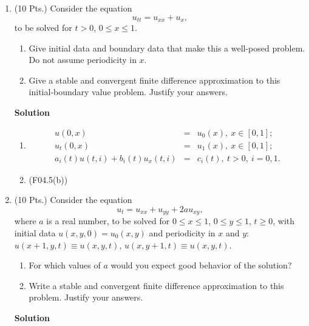 \documentclass{article}
\begin{document}
\begin{enumerate}
\begin{enumerate}
\end{enumerate}



\item (10 Pts.) Consider the equation
\[u_{tt} = u_{xx} + u_x,\]
to be solved for \(t > 0\), \(0 \leq x \leq 1\).

\begin{enumerate}
\item Give initial data and boundary data that make this a well-posed problem.  Do not assume periodicity in \(x\).

\item Give a stable and convergent finite difference approximation to this initial-boundary value problem.  Justify your answers.

\end{enumerate}

{\bf Solution}

\begin{enumerate}
\item
\begin{eqnarray*}
u(0,x) & = & u_0(x), \ x \in [0,1]; \\
u_t(0,x) & = & u_1(x), \ x \in [0,1]; \\
a_i(t)u(t,i) + b_i(t)u_x(t,i) & = & c_i(t), \ t > 0, \ i = 0,1.
\end{eqnarray*}

\item (F04.5(b))

\end{enumerate}



\item (10 Pts.) Consider the equation
\[u_t = u_{xx} + u_{yy} + 2a u_{xy},\]
where \(a\) is a real number, to be solved for \(0 \leq x \leq 1\), \(0 \leq y \leq 1\), \(t \geq 0\), with initial data \(u(x,y,0) = u_0(x,y)\) and periodicity in \(x\) and \(y\):  \(u(x + 1, y, t) \equiv u(x,y,t)\), \(u(x, y + 1, t) \equiv u(x,y,t)\).

\begin{enumerate}
\item For which values of \(a\) would you expect good behavior of the solution?

\item Write a stable and convergent finite difference approximation to this problem.  Justify your answers.

\end{enumerate}

{\bf Solution}


\end{enumerate}
\end{document}
